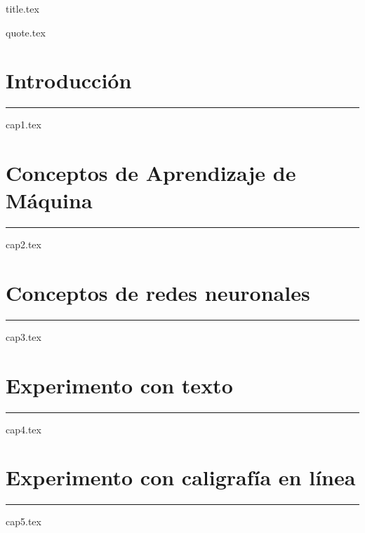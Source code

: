 \documentclass[12 pt]{book}
\numberwithin{equation}{section}
\theoremstyle{plain}
\theoremstyle{definition}
\begin{document}
\frontmatter
{title.tex}

{quote.tex}

\let\cleardoublepage\clearpage
\tableofcontents
\clearpage
\thispagestyle{empty}

\let\cleardoublepage\clearpage

\mainmatter
\ChTitleUpperCase

\chapter{Introducción}
\noindent
\rule{\textwidth}{1pt}
{cap1.tex}
\chapter{Conceptos de Aprendizaje de Máquina}
\noindent
\rule{\textwidth}{1pt}
{cap2.tex}
\chapter{Conceptos de redes neuronales}
\noindent
\rule{\textwidth}{1pt}
{cap3.tex}
\chapter{Experimento con texto}
\noindent
\rule{\textwidth}{1pt}
{cap4.tex}
\chapter{Experimento con caligrafía en línea}
\noindent
\rule{\textwidth}{1pt}
{cap5.tex}

\backmatter



\newpage
\end{document}
